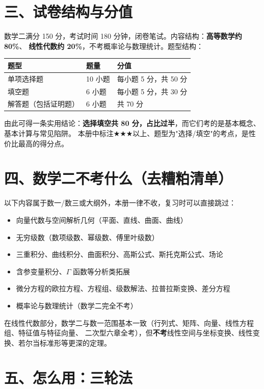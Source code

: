 \section*{三、试卷结构与分值}

数学二满分 150 分，考试时间 180 分钟，闭卷笔试。内容结构：\textbf{高等数学约 80\%}、
\textbf{线性代数约 20\%}，不考概率论与数理统计。题型结构：

\begin{center}
\begin{tabular}{@{}lll@{}}
\toprule
\textbf{题型} & \textbf{题量} & \textbf{分值} \\
\midrule
单项选择题 & 10 小题 & 每小题 5 分，共 50 分 \\
填空题 & 6 小题 & 每小题 5 分，共 30 分 \\
解答题（包括证明题） & 6 小题 & 共 70 分 \\
\bottomrule
\end{tabular}
\end{center}

由此可得一条实用结论：\textbf{选择填空共 80 分，占比过半}，而它们考的是基本概念、基本计算与常见陷阱。
本册中标注$\bigstar\bigstar\bigstar$以上、题型为"选择/填空"的考点，是性价比最高的得分点。

\section*{四、数学二不考什么（去糟粕清单）}

以下内容属于数一/数三或大纲外，本册一律不收，复习时可以直接跳过：

\begin{itemize}
  \item 向量代数与空间解析几何（平面、直线、曲面、曲线）
  \item 无穷级数（数项级数、幂级数、傅里叶级数）
  \item 三重积分、曲线积分、曲面积分、高斯公式、斯托克斯公式、场论
  \item 含参变量积分、$\Gamma$ 函数等分析类拓展
  \item 微分方程的欧拉方程、方程组、级数解法、拉普拉斯变换、差分方程
  \item 概率论与数理统计（数学二完全不考）
\end{itemize}

在线性代数部分，数学二与数一范围基本一致（行列式、矩阵、向量、线性方程组、特征值与特征向量、
二次型六章全考），但\textbf{不考}线性空间与坐标变换、线性变换、若尔当标准形等更深的定理。

\section*{五、怎么用：三轮法}

